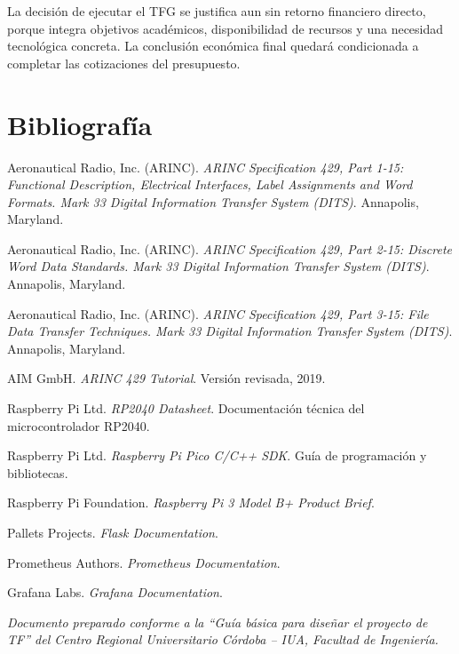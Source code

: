\documentclass[12pt,a4paper,oneside]{article}
\begin{document}
La decisión de ejecutar el TFG se justifica aun sin retorno financiero directo, porque integra objetivos académicos, disponibilidad de recursos y una necesidad tecnológica concreta. La conclusión económica final quedará condicionada a completar las cotizaciones del presupuesto.

\section{Bibliografía}

\begin{enumerate}[label={[\arabic*]},ref=\arabic*,leftmargin=2.1em]
  \item \label{bib:arinc1} Aeronautical Radio, Inc. (ARINC). \textit{ARINC Specification 429, Part 1-15: Functional Description, Electrical Interfaces, Label Assignments and Word Formats. Mark 33 Digital Information Transfer System (DITS)}. Annapolis, Maryland.
  \item \label{bib:arinc2} Aeronautical Radio, Inc. (ARINC). \textit{ARINC Specification 429, Part 2-15: Discrete Word Data Standards. Mark 33 Digital Information Transfer System (DITS)}. Annapolis, Maryland.
  \item \label{bib:arinc3} Aeronautical Radio, Inc. (ARINC). \textit{ARINC Specification 429, Part 3-15: File Data Transfer Techniques. Mark 33 Digital Information Transfer System (DITS)}. Annapolis, Maryland.
  \item \label{bib:aim} AIM GmbH. \textit{ARINC 429 Tutorial}. Versión revisada, 2019.
  \item \label{bib:rp2040} Raspberry Pi Ltd. \textit{RP2040 Datasheet}. Documentación técnica del microcontrolador RP2040.
  \item \label{bib:picosdk} Raspberry Pi Ltd. \textit{Raspberry Pi Pico C/C++ SDK}. Guía de programación y bibliotecas.
  \item \label{bib:rpi3} Raspberry Pi Foundation. \textit{Raspberry Pi 3 Model B+ Product Brief}.
  \item \label{bib:flask} Pallets Projects. \textit{Flask Documentation}.
  \item \label{bib:prometheus} Prometheus Authors. \textit{Prometheus Documentation}.
  \item \label{bib:grafana} Grafana Labs. \textit{Grafana Documentation}.
\end{enumerate}

\vfill
\begin{center}
  \small
  \textit{Documento preparado conforme a la ``Guía básica para diseñar el proyecto de TF'' del Centro Regional Universitario Córdoba -- IUA, Facultad de Ingeniería.}
\end{center}
\end{document}
